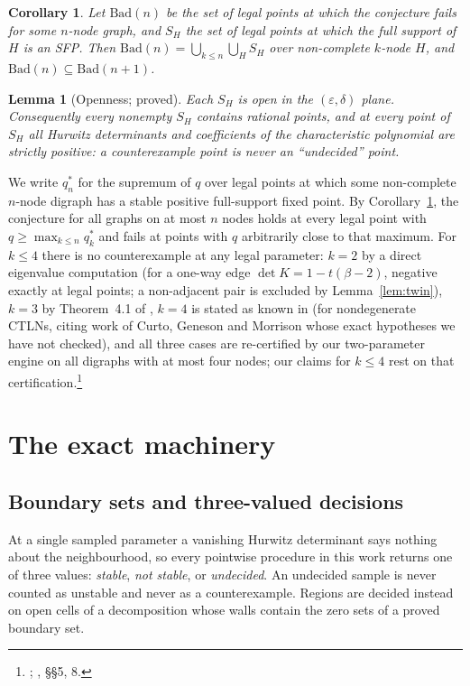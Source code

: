 \documentclass[11pt]{article}
\newtheorem{lemma}[theorem]{Lemma}
\newtheorem{corollary}[theorem]{Corollary}
\theoremstyle{definition}
\newcommand{\eps}{\varepsilon}
\begin{document}
\begin{corollary}\label{cor:monotone}
Let $\mathrm{Bad}(n)$ be the set of legal points at which the conjecture fails for some $n$-node graph, and $S_H$
the set of legal points at which the full support of $H$ is an SFP. Then
$\mathrm{Bad}(n)=\bigcup_{k\le n}\bigcup_{H}S_H$ over non-complete $k$-node $H$, and
$\mathrm{Bad}(n)\subseteq\mathrm{Bad}(n+1)$.
\end{corollary}

\begin{lemma}[Openness; proved]\label{lem:open}
Each $S_H$ is open in the $(\eps,\delta)$ plane. Consequently every nonempty $S_H$ contains rational points,
and at every point of $S_H$ all Hurwitz determinants and coefficients of the characteristic polynomial are
strictly positive: a counterexample point is never an ``undecided'' point.
\end{lemma}

We write $q_n^*$ for the supremum of $q$ over legal points at which some non-complete $n$-node digraph has a
stable positive full-support fixed point. By Corollary~\ref{cor:monotone}, the conjecture for all graphs
on at most $n$ nodes holds at every legal point with $q\ge\max_{k\le n}q_k^*$ and fails at points with $q$
arbitrarily close to that maximum. For $k\le4$ there is no counterexample at any legal parameter: $k=2$ by
a direct eigenvalue computation (for a one-way edge $\det K=1-t(\beta-2)$, negative exactly at legal points; a non-adjacent pair is excluded by Lemma~\ref{lem:twin}), $k=3$ by Theorem~4.1 of
\cite{Geneson2026}, $k=4$ is stated as known in \cite{Geneson2026} (for nondegenerate CTLNs, citing work of Curto, Geneson and
Morrison whose exact hypotheses we have not checked), and all three cases are re-certified by our two-parameter engine on all
digraphs with at most four nodes; our claims for $k\le4$ rest on that certification.\footnote{; , \S\S5, 8.}

\section{The exact machinery}\label{sec:machinery}

\subsection{Boundary sets and three-valued decisions}\label{sec:boundary}
At a single sampled parameter a vanishing Hurwitz determinant says nothing about the neighbourhood, so
every pointwise procedure in this work returns one of three values: \emph{stable}, \emph{not stable}, or
\emph{undecided}. An undecided sample is never counted as unstable and never as a counterexample. Regions
are decided instead on open cells of a decomposition whose walls contain the zero sets of a proved boundary set.
\end{document}
